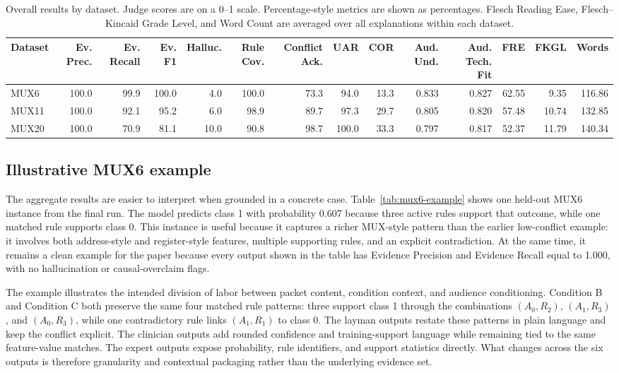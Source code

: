 \documentclass[sigconf,nonacm]{acmart}
\begin{document}
\begin{table}[t]
\caption{Overall results by dataset. Judge scores are on a 0--1 scale. Percentage-style metrics are shown as percentages. Flesch Reading Ease, Flesch--Kincaid Grade Level, and Word Count are averaged over all explanations within each dataset.}
\label{tab:dataset-results}
\centering
\small
\renewcommand{\arraystretch}{1.08}
\begin{tabular}{lrrrrrrrrrrrrr}
\toprule
\textbf{Dataset} & \textbf{Ev. Prec.} & \textbf{Ev. Recall} & \textbf{Ev. F1} & \textbf{Halluc.} & \textbf{Rule Cov.} & \textbf{Conflict Ack.} & \textbf{UAR} & \textbf{COR} & \textbf{Aud. Und.} & \textbf{Aud. Tech. Fit} & \textbf{FRE} & \textbf{FKGL} & \textbf{Words} \\
\midrule
MUX6  & 100.0 & 99.9 & 100.0 & 4.0 & 100.0 & 73.3 & 94.0 & 13.3 & 0.833 & 0.827 & 62.55 & 9.35 & 116.86 \\
MUX11 & 100.0 & 92.1 & 95.2  & 6.0 & 98.9  & 89.7 & 97.3 & 29.7 & 0.805 & 0.820 & 57.48 & 10.74 & 132.85 \\
MUX20 & 100.0 & 70.9 & 81.1  & 10.0 & 90.8 & 98.7 & 100.0 & 33.3 & 0.797 & 0.817 & 52.37 & 11.79 & 140.34 \\
\bottomrule
\end{tabular}
\end{table}

\subsection{Illustrative MUX6 example}
The aggregate results are easier to interpret when grounded in a concrete case. Table~\ref{tab:mux6-example} shows one held-out MUX6 instance from the final run. The model predicts class 1 with probability 0.607 because three active rules support that outcome, while one matched rule supports class 0. This instance is useful because it captures a richer MUX-style pattern than the earlier low-conflict example: it involves both address-style and register-style features, multiple supporting rules, and an explicit contradiction. At the same time, it remains a clean example for the paper because every output shown in the table has Evidence Precision and Evidence Recall equal to 1.000, with no hallucination or causal-overclaim flags.

The example illustrates the intended division of labor between packet content, condition context, and audience conditioning. Condition B and Condition C both preserve the same four matched rule patterns: three support class 1 through the combinations $(A_0, R_2)$, $(A_1, R_3)$, and $(A_0, R_3)$, while one contradictory rule links $(A_1, R_1)$ to class 0. The layman outputs restate these patterns in plain language and keep the conflict explicit. The clinician outputs add rounded confidence and training-support language while remaining tied to the same feature-value matches. The expert outputs expose probability, rule identifiers, and support statistics directly. What changes across the six outputs is therefore granularity and contextual packaging rather than the underlying evidence set.
\end{document}
